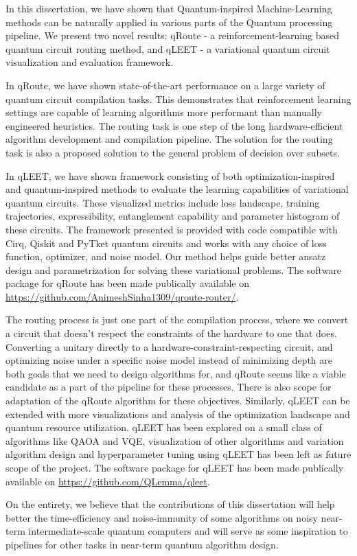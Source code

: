 In this dissertation, we have shown that Quantum-inspired Machine-Learning methods can be naturally applied in various parts of the Quantum processing pipeline. We present two novel results: qRoute - a reinforcement-learning based quantum circuit routing method, and qLEET - a variational quantum circuit visualization and evaluation framework.

In qRoute, we have shown state-of-the-art performance on a large variety of quantum circuit compilation tasks. This demonstrates that reinforcement learning settings are capable of learning algorithms more performant than manually engineered heuristics. The routing task is one step of the long hardware-efficient algorithm development and compilation pipeline. The solution for the routing task is also a proposed solution to the general problem of decision over subsets.

In qLEET, we have shown framework consisting of both optimization-inspired and quantum-inspired methods to evaluate the learning capabilities of variational quantum circuits. These visualized metrics include loss landscape, training trajectories, expressibility, entanglement capability and parameter histogram of these circuits. The framework presented is provided with code compatible with Cirq, Qiskit and PyTket quantum circuits and works with any choice of loss function, optimizer, and noise model. Our method helps guide better ansatz design and parametrization for solving these variational problems.
The software package for qRoute has been made publically available on \url{https://github.com/AnimeshSinha1309/qroute-router/}.

The routing process is just one part of the compilation process, where we convert a circuit that doesn't respect the constraints of the hardware to one that does. Converting a unitary directly to a hardware-constraint-respecting circuit, and optimizing noise under a specific noise model instead of minimizing depth are both goals that we need to design algorithms for, and qRoute seems like a viable candidate as a part of the pipeline for these processes. There is also scope for adaptation of the qRoute algorithm for these objectives. Similarly, qLEET can be extended with more visualizations and analysis of the optimization landscape and quantum resource utilization. qLEET has been explored on a small class of algorithms like QAOA and VQE, visualization of other algorithms and variation algorithm design and hyperparameter tuning using qLEET has been left as future scope of the project. The software package for qLEET has been made publically available on \url{https://github.com/QLemma/qleet}.


On the entirety, we believe that the contributions of this dissertation will help better the time-efficiency and noise-immunity of some algorithms on noisy near-term intermediate-scale quantum computers and will serve as some inspiration to pipelines for other tasks in near-term quantum algorithm design.
